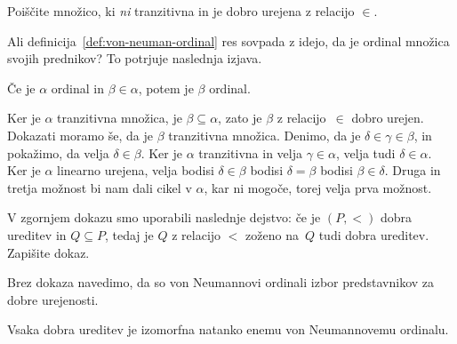 \begin{naloga}
  Poiščite množico, ki \emph{ni} tranzitivna in je dobro urejena z relacijo $\in$.
\end{naloga}

Ali definicija~\ref{def:von-neuman-ordinal} res sovpada z idejo, da je ordinal množica svojih prednikov? To potrjuje naslednja izjava.

\begin{izjava}
  Če je $\alpha$ ordinal in $\beta \in \alpha$, potem je $\beta$ ordinal.
\end{izjava}

\begin{dokaz}
  Ker je $\alpha$ tranzitivna množica, je $\beta \subseteq \alpha$, zato je $\beta$ z relacijo~$\in$ dobro urejen.
  Dokazati moramo še, da je $\beta$ tranzitivna množica. Denimo, da je $\delta \in \gamma \in \beta$, in pokažimo, da velja $\delta \in \beta$. Ker je $\alpha$ tranzitivna in velja $\gamma \in \alpha$, velja tudi $\delta \in \alpha$.
  Ker je $\alpha$ linearno urejena, velja bodisi $\delta \in \beta$ bodisi $\delta = \beta$ bodisi $\beta \in \delta$. Druga in tretja možnost bi nam dali cikel v $\alpha$, kar ni mogoče, torej velja prva možnost.
\end{dokaz}

\begin{naloga}
  V zgornjem dokazu smo uporabili naslednje dejstvo: če je $(P, {<})$ dobra ureditev in $Q \subseteq P$, tedaj je $Q$ z relacijo $<$ zoženo na~$Q$ tudi dobra ureditev. Zapišite dokaz.
\end{naloga}

Brez dokaza navedimo, da so von Neumannovi ordinali izbor predstavnikov za dobre urejenosti.

\begin{izrek}
  Vsaka dobra ureditev je izomorfna natanko enemu von Neumannovemu ordinalu.
\end{izrek}

